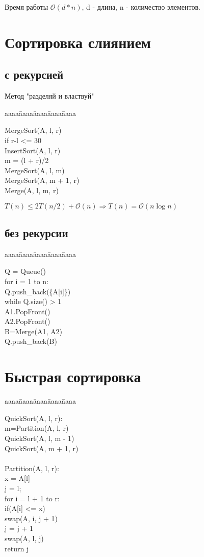 \documentclass[12pt]{article}
\def\t{\texttt}
\def\O{\mathcal{O}}
\newenvironment{MyTabbing}{
\t\bgroup
\begin{tabbing}
aaaa\=aaaa\=aaaa\=aaaa\=aaaa\kill
}{
\end{tabbing}
\t\egroup
}
\begin{document}
Время работы $\O(d * n)$, d - длина, n - количество элементов.

\section{Сортировка слиянием} 

\subsection{с рекурсией}

Метод "разделяй и властвуй"

\begin{MyTabbing}
MergeSort(A, l, r)\\
\>if r-l <= 30\\
\>\>InsertSort(A, l, r)\\
\>m = (l + r)/2\\
\>MergeSort(A, l, m)\\
\>MergeSort(A, m + 1, r)\\
\>Merge(A, l, m, r)\\
\end{MyTabbing}

$T(n) \le 2T(n/2) + \O(n) \Rightarrow T(n) = \O(n\log n)$

\subsection{без рекурсии}

\begin{MyTabbing} 
Q = Queue()\\
for i = 1 to n:\\
\>Q.push\_back(\{A[i]\})\\
while Q.size() > 1\\
\>A1.PopFront()\\
\>A2.PopFront()\\
\>B=Merge(A1, A2)\\
\>Q.push\_back(B)\\
\end{MyTabbing}

\section{Быстрая сортировка}

\begin{MyTabbing}
QuickSort(A, l, r):\\
\>m=Partition(A, l, r)\\
\>QuickSort(A, l, m - 1)\\
\>QuickSort(A, m + 1, r)\\
\\
Partition(A, l, r):\\
\>x = A[l]\\
\>j = l;\\
\>for i = l + 1 to r:\\
\>\>if(A[i] <= x) \\
\>\>\>swap(A, i, j + 1)\\
\>\>\>j = j + 1\\
\>swap(A, l, j)\\
\>return j\\
\end{MyTabbing}
\end{document}
